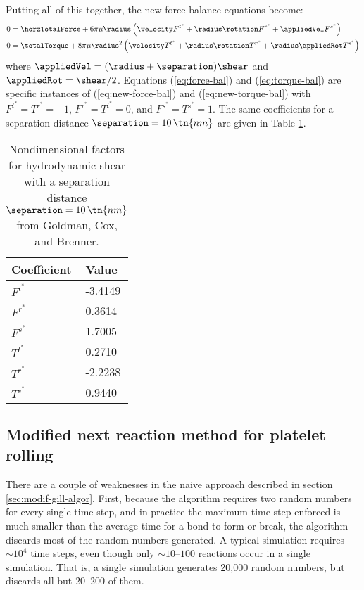 Putting all of this together, the new force balance equations become:
\begin{align}
  \label{eq:new-force-bal}
  0 &= \horzTotalForce + 6\pi\mu\radius \left(\velocity F^{t^*} +
      \radius\rotation F^{r^*} + \appliedVel F^{s^*}
      \right) \\
  \label{eq:new-torque-bal}
  0 &= \totalTorque + 8\pi\mu\radius^2 \left(\velocity T^{t^*} +
      \radius\rotation T^{r^*} + \radius\appliedRot T^{s^*}
      \right)
\end{align}
where $\appliedVel = (\radius + \separation)\shear$ and
$\appliedRot = \shear/2$. Equations (\ref{eq:force-bal}) and
(\ref{eq:torque-bal}) are specific instances of
(\ref{eq:new-force-bal}) and (\ref{eq:new-torque-bal}) with
$F^{t^*} = T^{r^*} = -1$, $F^{r^*} = T^{t^*} = 0$, and
$F^{s^*} = T^{s^*} = 1$. The same coefficients for a separation
distance $\separation = 10 \, \tn{nm}$ are given in Table
\ref{tab:nondim-drag}.

\begin{table}
  \centering
  \begin{tabular}{ll}
    \toprule
    Coefficient & Value \\
    \midrule
    $F^{t^*}$ & -3.4149 \\
    $F^{r^*}$ & 0.3614 \\
    $F^{s^*}$ & 1.7005 \\
    $T^{t^*}$ & 0.2710 \\
    $T^{r^*}$ & -2.2238 \\
    $T^{s^*}$ & 0.9440 \\
    \bottomrule
  \end{tabular}
  \caption[Nondimensional drag coefficients]{Nondimensional factors
    for hydrodynamic shear with a separation distance $\separation =
    10 \, \tn{nm}$ from Goldman, Cox, and Brenner.}
  \label{tab:nondim-drag}
\end{table}

\subsection{Modified next reaction method for platelet rolling}
\label{sec:modif-next-react}

There are a couple of weaknesses in the naive approach described in
section \ref{sec:modif-gill-algor}. First, because the algorithm
requires two random numbers for every single time step, and in
practice the maximum time step enforced is much smaller than the
average time for a bond to form or break, the algorithm discards most
of the random numbers generated. A typical simulation requires
$\sim10^4$ time steps, even though only $\sim10$--$100$ reactions
occur in a single simulation. That is, a single simulation generates
20,000 random numbers, but discards all but 20--200 of them.

